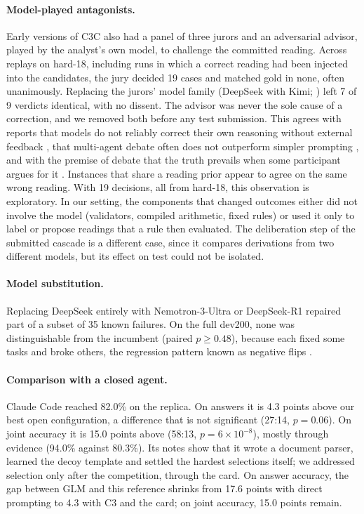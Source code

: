 \documentclass[11pt]{article}%
\begin{document}
\paragraph{Model-played antagonists.} Early versions of \textsc{C3C} also had
a panel of three jurors and an adversarial advisor, played by the analyst's own
model, to challenge the committed reading.
Across replays on hard-18, including runs in which a correct reading had been
injected into the candidates, the jury decided 19 cases and matched gold in
none, often unanimously. Replacing the jurors' model family (DeepSeek with Kimi; \citealp{kimi2025k2}) left 7 of 9 verdicts identical, with no dissent. The advisor was never
the sole cause of a correction, and we removed both before any test
submission. This agrees with reports that models do not reliably correct their
own reasoning without external feedback \citep{huang2024selfcorrect}, that
multi-agent debate often does not outperform simpler prompting
\citep{smit2024mad}, and with the premise of debate that the truth prevails when some participant
argues for it \citep{irving2018debate}. Instances that
share a reading prior appear to agree on the same wrong reading. With 19
decisions, all from hard-18, this observation is exploratory. In our setting, the components that changed outcomes either did
not involve the model (validators, compiled arithmetic, fixed rules) or used it
only to label or propose readings that a rule then evaluated. The deliberation
step of the submitted cascade is a different case, since it compares
derivations from two different models, but its effect on test could not be
isolated.

\paragraph{Model substitution.} Replacing DeepSeek entirely with
Nemotron-3-Ultra or DeepSeek-R1 repaired part of a subset of 35
known failures. On the full dev200, none was distinguishable from the
incumbent (paired $p\geq0.48$), because each fixed some tasks and broke others, the regression pattern known as negative flips \citep{yan2021pct}.

\paragraph{Comparison with a closed agent.} Claude Code reached 82.0\% on the
replica. On answers it is 4.3 points above our best open configuration, a
difference that is not significant (27:14, $p=0.06$). On joint accuracy it is
15.0 points above (58:13, $p=6{\times}10^{-8}$), mostly through evidence
(94.0\% against 80.3\%). Its notes show that it wrote a document parser,
learned the decoy template and settled the hardest selections itself; we addressed selection only after the competition, through the card. On answer accuracy, the gap between
GLM and this reference shrinks from 17.6 points with direct prompting to 4.3
with \textsc{C3} and the card; on joint accuracy, 15.0 points remain.
\end{document}
